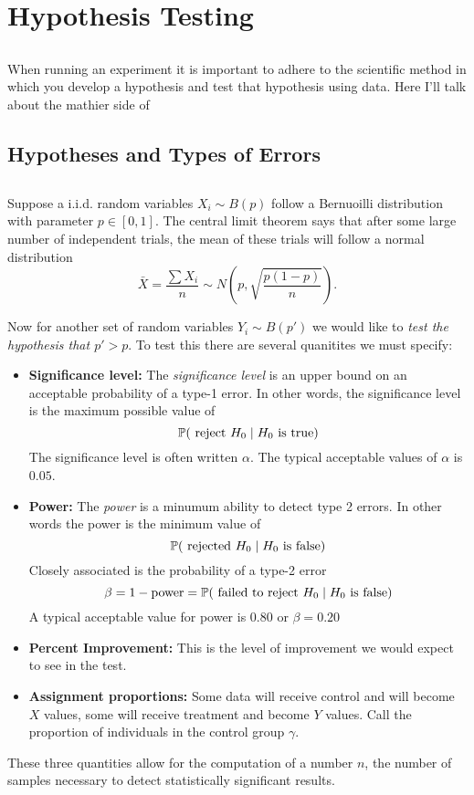 \section{Hypothesis Testing}
\label{sec:hypothesis}

\subsection{} When running an experiment it is important to adhere to the scientific method in which you develop a hypothesis and test that hypothesis using data. Here I'll talk about the mathier side of  

\subsection{Hypotheses and Types of Errors}



\subsection{} Suppose a i.i.d. random variables $X_i \sim B(p)$ follow a Bernuoilli distribution with parameter $p \in [0,1]$. The central limit theorem says that after some large number of independent trials, the mean of these trials will follow a normal distribution
\[
    \bar X = \frac{\sum X_i}{n} \sim N\left(p, \sqrt{\frac{p (1-p)}{n}}\right).
\]

Now for another set of random variables $Y_i \sim B(p')$ we would like to \emph{test the hypothesis that $p' > p$}. To test this there are several quanitites we must specify:
\begin{itemize}
    \item \textbf{Significance level:} The \emph{significance level} is an upper bound on an acceptable probability of a type-1 error. In other words, the significance level is the maximum possible value of 
    \[\mathbb{P}(\text{ reject } H_0 \mid H_0 \text{ is true})\]
    The significance level is often written $\alpha$. The typical acceptable values of $\alpha$ is $0.05$.
    \item \textbf{Power:} The \emph{power} is a minumum ability to detect type 2 errors. In other words the power is the minimum value of
    \[
        \mathbb{P}(\text{ rejected } H_0 \mid H_0 \text{ is false})
    \]
    Closely associated is the probability of a type-2 error
    \[\beta = 1 - \text{power} = \mathbb{P}(\text{ failed to reject } H_0 \mid H_0 \text{ is false})\]
    A typical acceptable value for power is $0.80$ or $\beta = 0.20$
    \item \textbf{Percent Improvement:} This is the level of improvement we would expect to see in the test.
    \item \textbf{Assignment proportions:} Some data will receive control and will become $X$ values, some will receive treatment and become $Y$ values. Call the proportion of individuals in the control group $\gamma$.
\end{itemize}
These three quantities allow for the computation of a number $n$, the number of samples necessary to detect statistically significant results.

